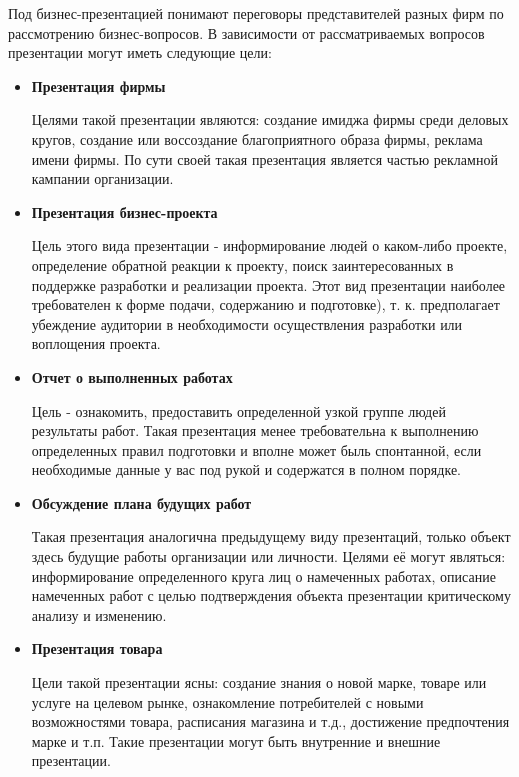 \documentclass[11pt]{article}
\theoremstyle{plain} %
\theoremstyle{definition} %
\theoremstyle{remark} %
\begin{document}
Под бизнес-презентацией понимают переговоры представителей разных фирм по рассмотрению бизнес-вопросов. В зависимости от рассматриваемых вопросов презентации могут иметь следующие цели:
\begin{itemize}
	\item \textbf{Презентация фирмы}

	Целями такой презентации являются: создание имиджа фирмы среди деловых кругов, создание или воссоздание благоприятного образа фирмы, реклама имени фирмы. По сути своей такая презентация является частью рекламной кампании организации.
	\item \textbf{Презентация бизнес-проекта}

	Цель этого вида презентации - информирование людей о каком-либо проекте, определение обратной реакции к проекту, поиск заинтересованных в поддержке разработки и реализации проекта. Этот вид презентации наиболее требователен к форме подачи, содержанию и подготовке), т. к. предполагает убеждение аудитории в необходимости осуществления разработки или воплощения проекта.
	\item \textbf{Отчет о выполненных работах}

	Цель - ознакомить, предоставить определенной узкой группе людей результаты работ. Такая презентация менее требовательна к выполнению определенных правил подготовки и вполне может быль спонтанной, если необходимые данные у вас под рукой и содержатся в полном порядке.
	\item \textbf{Обсуждение плана будущих работ}

	Такая презентация аналогична предыдущему виду презентаций, только объект здесь будущие работы организации или личности. Целями её могут являться: информирование определенного круга лиц о намеченных работах, описание намеченных работ с целью подтверждения объекта презентации критическому анализу и изменению.
	\item \textbf{Презентация товара}

	Цели такой презентации ясны: создание знания о новой марке, товаре или услуге на целевом рынке, ознакомление потребителей с новыми возможностями товара, расписания магазина и т.д., достижение предпочтения марке и т.п. Такие презентации могут быть внутренние и внешние презентации.

\end{itemize}
\end{document}
